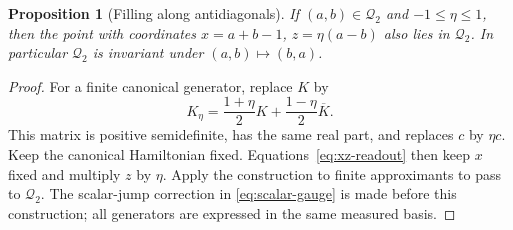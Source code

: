 \documentclass[11pt]{article}
\newtheorem{proposition}[theorem]{Proposition}
\theoremstyle{definition}
\theoremstyle{remark}
\newcommand{\Q}{\mathcal Q_2}
\begin{document}
\begin{proposition}[Filling along antidiagonals]\label{prop:filling}
If \((a,b)\in\Q\) and \(-1\leq\eta\leq1\), then the point with coordinates
\(x=a+b-1\), \(z=\eta(a-b)\) also lies in \(\Q\). In particular \(\Q\) is invariant under \((a,b)\mapsto(b,a)\).
\end{proposition}
\begin{proof}
For a finite canonical generator, replace \(K\) by
\begin{equation}\label{eq:drift-scaling}
 K_\eta=\frac{1+\eta}{2}K+\frac{1-\eta}{2}\overline K.
\end{equation}
This matrix is positive semidefinite, has the same real part, and replaces \(c\) by \(\eta c\). Keep the canonical Hamiltonian fixed. Equations~\eqref{eq:xz-readout} then keep \(x\) fixed and multiply \(z\) by \(\eta\). Apply the construction to finite approximants to pass to \(\Q\). The scalar-jump correction in \eqref{eq:scalar-gauge} is made before this construction; all generators are expressed in the same measured basis.
\end{proof}
\end{document}
